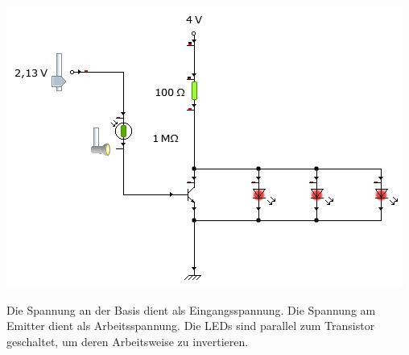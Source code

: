 \begin{Loesung}
\hfill \par
\begin{center}
\includegraphics[scale=.8]{pics/Daemmerungeinf}
\end{center}

Die Spannung an der Basis dient als Eingangsspannung.
Die Spannung am Emitter dient als Arbeitsspannung.
Die LEDs sind parallel zum Transistor geschaltet, um deren Arbeitsweise zu invertieren.
\end{Loesung}


